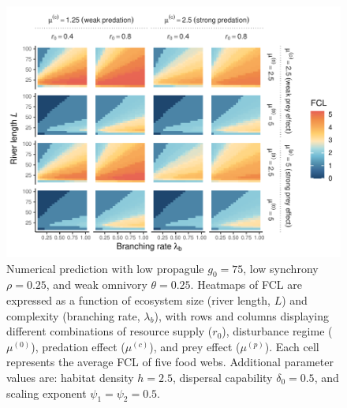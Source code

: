 \begin{figure}
\centering
\includegraphics{../data_fmt/fig_rho025_g75_theta025.pdf}
\caption{Numerical prediction with low propagule \(g_0 = 75\), low
synchrony \(\rho = 0.25\), and weak omnivory \(\theta = 0.25\). Heatmaps
of FCL are expressed as a function of ecosystem size (river length,
\(L\)) and complexity (branching rate, \(\lambda_b\)), with rows and
columns displaying different combinations of resource supply (\(r_0\)),
disturbance regime (\(\mu^{(0)}\)), predation effect (\(\mu^{(c)}\)),
and prey effect (\(\mu^{(p)}\)). Each cell represents the average FCL of
five food webs. Additional parameter values are: habitat density
\(h=2.5\), dispersal capability \(\delta_0=0.5\), and scaling exponent
\(\psi_1=\psi_2=0.5\).\label{fig:fig-num1}}
\end{figure}

\newpage

